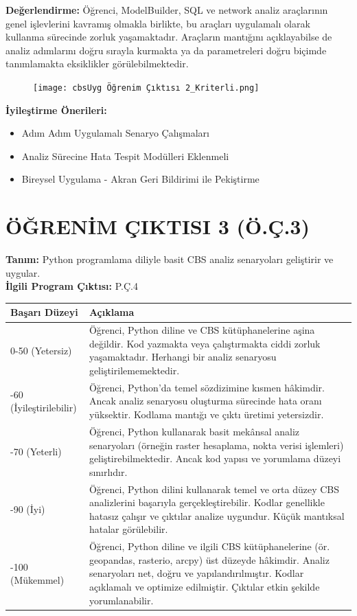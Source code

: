 \documentclass[12pt,a4paper]{article}
\begin{document}
\vspace{0.5cm}
\textbf{Değerlendirme:}
Öğrenci, ModelBuilder, SQL ve network analiz araçlarının genel işlevlerini kavramış olmakla birlikte, bu araçları uygulamalı olarak kullanma sürecinde zorluk yaşamaktadır. Araçların mantığını açıklayabilse de analiz adımlarını doğru sırayla kurmakta ya da parametreleri doğru biçimde tanımlamakta eksiklikler görülebilmektedir.

\begin{figure}[H]
 \centering
 \texttt{[image: cbsUyg Öğrenim Çıktısı 2\_Kriterli.png]} %
\end{figure}

\textbf{İyileştirme Önerileri:}
\begin{itemize}
    \item Adım Adım Uygulamalı Senaryo Çalışmaları
    \item Analiz Sürecine Hata Tespit Modülleri Eklenmeli
    \item Bireysel Uygulama - Akran Geri Bildirimi ile Pekiştirme
\end{itemize}

\newpage

\section*{ÖĞRENİM ÇIKTISI 3 (Ö.Ç.3)}
\textbf{Tanım:} Python programlama diliyle basit CBS analiz senaryoları geliştirir ve uygular.\\
\textbf{İlgili Program Çıktısı:} P.Ç.4

\vspace{0.5cm}
\begin{longtable}{p{3cm}p{12cm}}
\toprule
\textbf{Başarı Düzeyi} & \textbf{Açıklama} \\
\midrule
0-50 (Yetersiz) & Öğrenci, Python diline ve CBS kütüphanelerine aşina değildir. Kod yazmakta veya çalıştırmakta ciddi zorluk yaşamaktadır. Herhangi bir analiz senaryosu geliştirilememektedir. \\
\addlinespace
50-60 (İyileştirilebilir) & Öğrenci, Python'da temel sözdizimine kısmen hâkimdir. Ancak analiz senaryosu oluşturma sürecinde hata oranı yüksektir. Kodlama mantığı ve çıktı üretimi yetersizdir. \\
\addlinespace
60-70 (Yeterli) & Öğrenci, Python kullanarak basit mekânsal analiz senaryoları (örneğin raster hesaplama, nokta verisi işlemleri) geliştirebilmektedir. Ancak kod yapısı ve yorumlama düzeyi sınırlıdır. \\
\addlinespace
70-90 (İyi) & Öğrenci, Python dilini kullanarak temel ve orta düzey CBS analizlerini başarıyla gerçekleştirebilir. Kodlar genellikle hatasız çalışır ve çıktılar analize uygundur. Küçük mantıksal hatalar görülebilir. \\
\addlinespace
90-100 (Mükemmel) & Öğrenci, Python diline ve ilgili CBS kütüphanelerine (ör. geopandas, rasterio, arcpy) üst düzeyde hâkimdir. Analiz senaryoları net, doğru ve yapılandırılmıştır. Kodlar açıklamalı ve optimize edilmiştir. Çıktılar etkin şekilde yorumlanabilir. \\
\bottomrule
\end{longtable}
\end{document}
